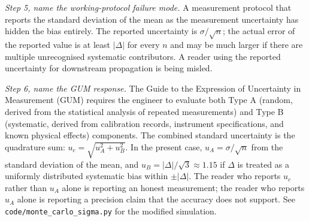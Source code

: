 \begin{exercise}
\textit{Step 5, name the working-protocol failure mode.} A
measurement protocol that reports the standard deviation of the
mean as the measurement uncertainty has hidden the bias entirely.
The reported uncertainty is $\sigma/\sqrt{n}$; the actual error of
the reported value is at least $|\Delta|$ for every $n$ and may be
much larger if there are multiple unrecognised systematic
contributors. A reader using the reported uncertainty for
downstream propagation is being misled.

\textit{Step 6, name the GUM response.} The Guide to the Expression
of Uncertainty in Measurement (GUM) requires the engineer to
evaluate both Type A (random, derived from the statistical analysis
of repeated measurements) and Type B (systematic, derived from
calibration records, instrument specifications, and known physical
effects) components. The combined standard uncertainty is the
quadrature sum: $u_{c} = \sqrt{u_{A}^{2} + u_{B}^{2}}$. In the
present case, $u_{A} = \sigma/\sqrt{n}$ from the standard deviation
of the mean, and $u_{B} = |\Delta|/\sqrt{3} \approx 1.15$ if
$\Delta$ is treated as a uniformly distributed systematic bias
within $\pm |\Delta|$. The reader who reports $u_{c}$ rather than
$u_{A}$ alone is reporting an honest measurement; the reader who
reports $u_{A}$ alone is reporting a precision claim that the
accuracy does not support. See
\texttt{code/monte\_carlo\_sigma.py} for the modified simulation.
\end{exercise}

